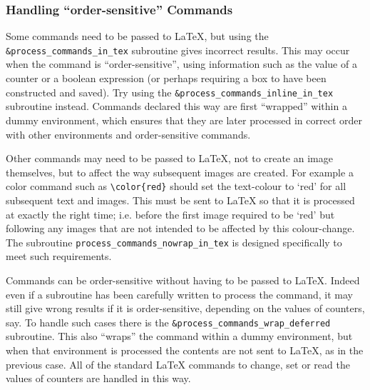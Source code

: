 \subsubsection{Handling ``order-sensitive'' Commands\label{sensit}}%
%
%
%
\begin{changebar}
Some commands need to be passed to \LaTeX, but using the
\verb|&process_commands_in_tex| subroutine gives incorrect results.
This may occur when the command is ``order-sensitive'',
using information such as the value of a counter or a boolean expression
(or perhaps requiring a box to have been constructed and saved).
Try using the \verb|&process_commands_inline_in_tex| subroutine instead.
Commands declared this way are first ``wrapped'' within a dummy environment,
which ensures that they are later processed in correct order with other
environments and order-sensitive commands.

\label{setparam}\html{\\}%

Other commands may need to be passed to \LaTeX, not to create an image
themselves, but to affect the way subsequent images are created.
For example a color command such as \verb|\color{red}| should set the
text-colour to `red' for all subsequent text and images. This must
be sent to \LaTeX{} so that it is processed at exactly the right time;
i.e. before the first image required to be `red' but following any
images that are not intended to be affected by this colour-change.\html{\\}
The subroutine \verb|process_commands_nowrap_in_tex| is designed
specifically to meet such requirements.

\label{wrapdef}\html{\\}%

Commands can be order-sensitive without having to be passed to \LaTeX.
Indeed even if a \Perl{} subroutine has been carefully written to process
the command, it may still give wrong results if it is order-sensitive,
depending on the values of counters, say.
To handle such cases there is the \verb|&process_commands_wrap_deferred|
subroutine. This also ``wraps'' the command within a dummy environment,
but when that environment is processed the contents are not sent to \LaTeX,
as in the previous case. All of the standard \LaTeX{} commands to change,
set or read the values of counters are handled in this way.
\end{changebar}



